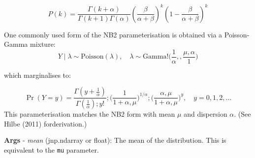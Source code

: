 \documentclass[
  letterpaper,
  DIV=11,
  numbers=noendperiod]{scrartcl}
\begin{document}
\[
P(k) = \frac{\Gamma(k + \alpha)}{\Gamma(k + 1) \Gamma(\alpha)} \left(\frac{\beta}{\alpha + \beta}\right)^k \left(1 - \frac{\beta}{\alpha + \beta}\right)^k
\]

One commonly used form of the NB2 parameterisation is obtained via a
Poisson‐Gamma mixture: \[
Y \mid \lambda \sim \text{Poisson}(\lambda), \quad \lambda \sim \text{Gamma}!\Big(\frac{1}{\alpha},,\frac{\mu,\alpha}{1}\Big)
\]

which marginalises to:

\[
\Pr(Y = y) = \frac{\Gamma(y + \tfrac1\alpha)}{\Gamma(\tfrac1\alpha); y!}; \bigg(\frac{1}{1 + \alpha,\mu}\bigg)^{1/\alpha}; \bigg(\frac{\alpha,\mu}{1 + \alpha,\mu}\bigg)^{y}, \quad y = 0,1,2,\dots
\] This parameterisation matches the NB2 form with mean \(\mu\) and
dispersion \(\alpha\). (See Hilbe (2011) forderivation.)

\textbf{Args} - \emph{mean} (jnp.ndarray or float): The mean of the
distribution. This is equivalent to the \texttt{mu} parameter.
\end{document}
